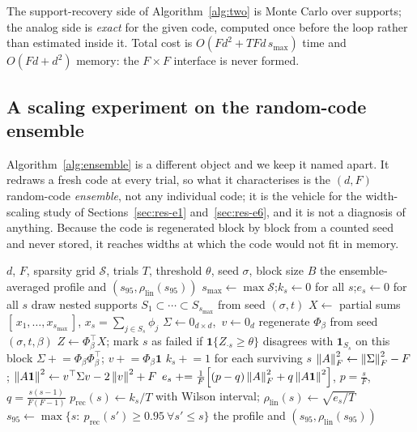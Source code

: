 The support-recovery side of Algorithm~\ref{alg:two} is Monte Carlo over supports; the analog
side is \emph{exact} for the given code, computed once before the loop rather than estimated
inside it. Total cost is $O(Fd^2+TFd\,s_{\max})$ time and $O(Fd+d^2)$ memory: the $F\times F$
interface is never formed.

\subsection{A scaling experiment on the random-code ensemble}
\label{sec:alg-ensemble}

Algorithm~\ref{alg:ensemble} is a different object and we keep it named apart. It redraws a
fresh code at every trial, so what it characterises is the $(d,F)$ random-code \emph{ensemble},
not any individual code; it is the vehicle for the width-scaling study of
Sections~\ref{sec:res-e1} and~\ref{sec:res-e6}, and it is not a diagnosis of anything. Because
the code is regenerated block by block from a counted seed and never stored, it reaches widths
at which the code would not fit in memory.

\begin{algorithm}[t]
\caption{\textsc{EnsembleScaling} --- the same two criteria, averaged over random codes}
\label{alg:ensemble}
\begin{algorithmic}[1]
\Require $d$, $F$, sparsity grid $\mathcal S$, trials $T$, threshold $\theta$, seed $\sigma$,
  block size $B$
\Ensure the ensemble-averaged profile and $(s_{95},\rho_{\mathrm{lin}}(s_{95}))$
\State $s_{\max}\gets\max\mathcal S$;\quad $k_s\gets0$ for all $s$;\quad $e_s\gets0$ for all $s$
  \State draw nested supports $S_1\subset\cdots\subset S_{s_{\max}}$ from seed $(\sigma,t)$
  \State $X\gets$ partial sums $[\,x_1,\dots,x_{s_{\max}}\,]$, $x_s=\sum_{j\in S_s}\phi_j$
  \State $\Sigma\gets 0_{d\times d}$,\ $v\gets 0_d$
    \State regenerate $\Phi_\beta$ from seed $(\sigma,t,\beta)$ 
    \State $Z\gets\Phi_\beta^{\top}X$; mark $s$ as failed if
      $\mathbf 1\{Z_{\cdot s}\ge\theta\}$ disagrees with $\mathbf 1_{S_s}$ on this block
    \State $\Sigma\mathrel{+}=\Phi_\beta\Phi_\beta^{\top}$;\quad
           $v\mathrel{+}=\Phi_\beta\mathbf 1$
  \EndFor
  \State $k_s\mathrel{+}=1$ for each surviving $s$
  \State $\left\lVert A \right\rVert_F^2\gets\left\lVert \Sigma \right\rVert_F^2-F$;\quad
         $\left\lVert A\mathbf 1 \right\rVert^2\gets v^{\top}\Sigma v-2\left\lVert v \right\rVert^2+F$
  \State $e_s\mathrel{+}=\frac1F\!\left[(p-q)\left\lVert A \right\rVert_F^2+q\left\lVert A\mathbf 1 \right\rVert^2\right]$,
    $p=\tfrac sF$, $q=\tfrac{s(s-1)}{F(F-1)}$ 
\EndFor
\State $p_{\mathrm{rec}}(s)\gets k_s/T$ with Wilson interval;\quad
       $\rho_{\mathrm{lin}}(s)\gets\sqrt{e_s/T}$
\State $s_{95}\gets\max\{s:\ p_{\mathrm{rec}}(s')\ge0.95\ \forall s'\le s\}$
\State \Return the profile and $(s_{95},\rho_{\mathrm{lin}}(s_{95}))$
\end{algorithmic}
\end{algorithm}

